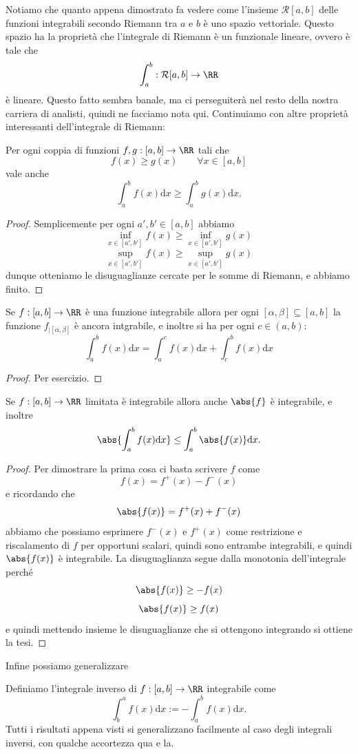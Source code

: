 \documentclass[11pt]{scrartcl}
\newcommand{\dif}{\text{d}}
\begin{document}
	Notiamo che quanto appena dimostrato fa vedere come l'insieme $\mathcal{R}[a,b]$ delle funzioni integrabili secondo Riemann tra $a$ e $b$ è uno spazio vettoriale. Questo spazio ha la proprietà che l'integrale di Riemann è un funzionale lineare, ovvero è tale che
	$$\int_a^b:\mathcal{R}[a,b]\to\RR$$
	è lineare. Questo fatto sembra banale, ma ci perseguiterà nel resto della nostra carriera di analisti, quindi ne facciamo nota qui. Continuiamo con altre proprietà interessanti dell'integrale di Riemann:
	\begin{lemma}
		Per ogni coppia di funzioni $f,g:[a,b]\to\RR$ tali che
		$$f(x)\ge g(x)\qquad \forall x\in [a,b]$$
		vale anche 
		$$\int_a^b f(x)\dif x\ge \int_a^b g(x)\dif x.$$
	\end{lemma}
	\begin{proof}
		Semplicemente per ogni $a',b'\in [a,b]$ abbiamo
		$$\inf_{x\in [a',b']}f(x)\ge \inf_{x\in [a',b']}g(x)$$
		$$\sup_{x\in [a',b']}f(x)\ge \sup_{x\in [a',b']}g(x)$$
		dunque otteniamo le disuguaglianze cercate per le somme di Riemann, e abbiamo finito.
	\end{proof}
	\begin{lemma}
		Se $f:[a,b]\to\RR$ è una funzione integrabile allora per ogni $[\alpha,\beta]\subseteq[a,b]$ la funzione $f_{\mid [\alpha,\beta]}$ è ancora intgrabile, e inoltre si ha per ogni $c\in (a,b)$:
		$$\int_a^b f(x)\dif x=\int_a^c f(x)\dif x+\int_c^b f(x)\dif x$$
	\end{lemma}
	\begin{proof}
		Per esercizio.
	\end{proof}
	\begin{theorem}
		Se $f:[a,b]\to\RR$ limitata è integrabile allora anche $\abs{f}$ è integrabile, e inoltre 
		$$\abs{\int_a^b f(x)\dif x}\le \int_a^b\abs{f(x)}\dif x.$$
	\end{theorem}
	\begin{proof}
		Per dimostrare la prima cosa ci basta scrivere $f$ come
		$$f(x)=f^+(x)-f^-(x)$$
		e ricordando che 
		$$\abs{f(x)}=f^+(x)+f^-(x)$$
		abbiamo che possiamo esprimere $f^-(x)$ e $f^+(x)$ come restrizione e riscalamento di $f$ per opportuni scalari, quindi sono entrambe integrabili, e quindi $\abs{f(x)}$ è integrabile. La disuguaglianza segue dalla monotonia dell'integrale perché
		$$\abs{f(x)}\ge -f(x)$$
		$$\abs{f(x)}\ge f(x)$$
		e quindi mettendo insieme le disuguaglianze che si ottengono integrando si ottiene la tesi.
	\end{proof}
	Infine possiamo generalizzare
	\begin{definition}
		Definiamo l'integrale inverso di $f:[a,b]\to\RR$ integrabile come
		$$\int_b^af(x)\dif x:=-\int_a^bf(x)\dif x.$$
		Tutti i risultati appena visti si generalizzano facilmente al caso degli integrali inversi, con qualche accortezza qua e la.
	\end{definition}
\end{document}
